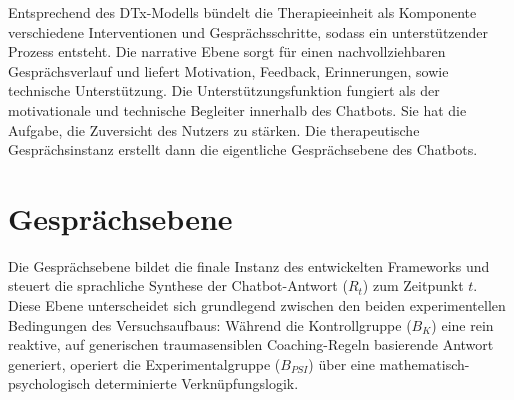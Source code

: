 Entsprechend des DTx-Modells bündelt die Therapieeinheit als Komponente verschiedene Interventionen und Gesprächsschritte, sodass ein unterstützender Prozess entsteht. Die narrative Ebene sorgt für einen nachvollziehbaren Gesprächsverlauf und liefert Motivation, Feedback, Erinnerungen, sowie technische Unterstützung. Die Unterstützungsfunktion fungiert als der motivationale und technische Begleiter innerhalb des Chatbots. Sie hat die Aufgabe, die Zuversicht des Nutzers zu stärken. Die therapeutische Gesprächsinstanz erstellt dann die eigentliche Gesprächsebene des Chatbots.


\section{Gesprächsebene}

Die Gesprächsebene bildet die finale Instanz des entwickelten Frameworks und steuert die sprachliche Synthese der Chatbot-Antwort ($R_t$) zum Zeitpunkt $t$. Diese Ebene unterscheidet sich grundlegend zwischen den beiden experimentellen Bedingungen des Versuchsaufbaus: Während die Kontrollgruppe ($B_K$) eine rein reaktive, auf generischen traumasensiblen Coaching-Regeln basierende Antwort generiert, operiert die Experimentalgruppe ($B_{PSI}$) über eine mathematisch-psychologisch determinierte Verknüpfungslogik.

